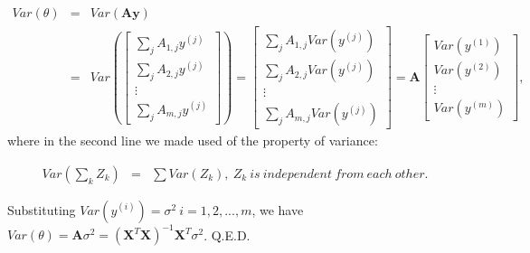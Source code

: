 \documentclass[english,11pt]{article}
\begin{document}
\begin{eqnarray}
Var(\theta) & = & Var(\boldsymbol{A}\boldsymbol{y})\\
 & = & Var(\left[\begin{array}{c}
\sum_{j}A_{1,j}y^{(j)}\\
\sum_{j}A_{2,j}y^{(j)}\\
\vdots\\
\sum_{j}A_{m,j}y^{(j)}
\end{array}\right])=\left[\begin{array}{c}
\sum_{j}A_{1,j}Var(y^{(j)})\\
\sum_{j}A_{2,j}Var(y^{(j)})\\
\vdots\\
\sum_{j}A_{m,j}Var(y^{(j)})
\end{array}\right]=\boldsymbol{A}\left[\begin{array}{c}
Var(y^{(1)})\\
Var(y^{(2)})\\
\vdots\\
Var(y^{(m)})
\end{array}\right],
\end{eqnarray}
where in the second line we made used of the property of variance:

\begin{eqnarray}
Var(\sum_{k}Z_{k}) & = & \sum Var(Z_{k}),\ Z_{k}\ is\ independent\ from\ each\ other.
\end{eqnarray}

Substituting $Var(y^{(i)})=\sigma^{2}\ i=1,2,...,m$, we have $Var(\theta)=\boldsymbol{A}\sigma^{2}=\left(\boldsymbol{X}^{T}\boldsymbol{X}\right)^{-1}\boldsymbol{X}^{T}\sigma^{2}$.
Q.E.D.
\end{document}
